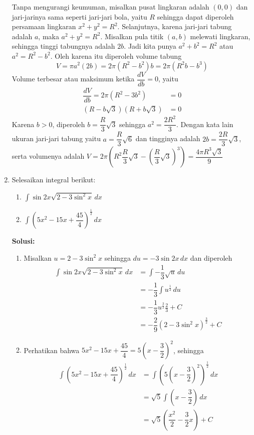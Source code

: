 \documentclass{article}
\begin{document}
\begin{enumerate}
\begin{center}
\begin{tikzpicture}[scale=0.8]
\end{tikzpicture}
	\end{center}	
 Tanpa mengurangi keumuman, misalkan pusat lingkaran adalah $(0,0)$ dan jari-jarinya sama seperti jari-jari bola, yaitu $R$ sehingga dapat diperoleh persamaan lingkaran $x^2+y^2=R^2$. Selanjutnya, karena jari-jari tabung adalah $a$, maka $a^2+y^2=R^2$. Misalkan pula titik $(a,b)$ melewati lingkaran, sehingga tinggi tabungnya adalah $2b$. Jadi kita punya $a^2+b^2=R^2$ atau $a^2=R^2-b^2$. Oleh karena itu diperoleh volume tabung
	$$ V = \pi a^2(2b) = 2\pi (R^2-b^2)b = 2\pi(R^2b-b^3) $$
	 Volume terbesar atau maksimum ketika $\dfrac{dV}{db}=0$, yaitu
	 \begin{align*}
	 \dfrac{dV}{db} = 2\pi (R^2-3b^2) &= 0 \\
	 (R-b\sqrt{3})(R+b\sqrt{3}) &=0
	 \end{align*}
	 Karena $b>0$, diperoleh $b=\dfrac{R}{3}\sqrt{3}$ sehingga $a^2=\dfrac{2R^2}{3}$. Dengan kata lain ukuran jari-jari tabung yaitu $a=\dfrac{R}{3}\sqrt{6}$ dan tingginya adalah $2b=\dfrac{2R}{3}\sqrt{3}$, serta volumenya adalah $V=2\pi \left(R^2\dfrac{R}{3}\sqrt{3}-\left(\dfrac{R}{3}\sqrt{3}\right)^3\right) = \dfrac{4\pi R^3\sqrt{3}}{9}$
	 \item Selesaikan integral berikut:
	 \begin{enumerate}
	 	\item $\displaystyle \int \sin 2x\sqrt{2-3\sin^2 x} \, dx$
	 	\item $\displaystyle \int \left(5x^2-15x+\dfrac{45}{4}\right)^{\frac{1}{2}} \, dx$
	 \end{enumerate}
	 \textbf{Solusi:}
	 \begin{enumerate}
	 	\item Misalkan $u=2-3\sin^2 x$ sehingga $du = -3\sin 2x \, dx$ dan diperoleh 
	 	\begin{align*}
	 	\int \sin 2x\sqrt{2-3\sin^2x} \, dx &= \int -\dfrac{1}{3}\sqrt{u} \, du \\
	 	&=  -\dfrac{1}{3} \int u^{\frac{1}{2}} \, du \\
	 	&= -\dfrac{1}{3}u^{\frac{3}{2}}\frac{2}{3} +C \\
		&= -\dfrac{2}{9}(2-3\sin^2x)^{\frac{3}{2}} + C
	 	\end{align*}
	 	\item Perhatikan bahwa $5x^2-15x+\dfrac{45}{4}=5\left(x-\dfrac{3}{2}\right)^2$, sehingga
	 	\begin{align*}
	 	\int \left(5x^2-15x+\dfrac{45}{4}\right)^{\frac{1}{2}} \, dx &= \int \left(5\left(x-\dfrac{3}{2}\right)^2\right)^{\frac{1}{2}} \, dx \\
	 	&= \sqrt{5}\int \left(x-\dfrac{3}{2}\right) \, dx \\
	 	&= \sqrt{5}\left(\dfrac{x^2}{2}-\dfrac{3}{2}x\right) +C  
	 	\end{align*}
	 \end{enumerate}
\end{enumerate}
\end{document}
